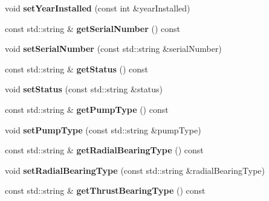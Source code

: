 \begin{DoxyCompactItemize}
\item 
\mbox{\label{class_pump_data_ae8b9757c60ce5d6bbc1b269f45205e16}} 
void {\bfseries set\+Year\+Installed} (const int \&year\+Installed)
\item 
\mbox{\label{class_pump_data_ae9f03754f319dc3ea833b22822f9b905}} 
const std\+::string \& {\bfseries get\+Serial\+Number} () const
\item 
\mbox{\label{class_pump_data_ac4dc6abcf6f6efc11ff1499d3e59d1e5}} 
void {\bfseries set\+Serial\+Number} (const std\+::string \&serial\+Number)
\item 
\mbox{\label{class_pump_data_acf09c826c9d73a69fd50f40479d509f3}} 
const std\+::string \& {\bfseries get\+Status} () const
\item 
\mbox{\label{class_pump_data_a0e4ac6c9e8440b66d5c02d7a592e93f5}} 
void {\bfseries set\+Status} (const std\+::string \&status)
\item 
\mbox{\label{class_pump_data_a387fe20da5c66f2619fd0f5d5c04eafd}} 
const std\+::string \& {\bfseries get\+Pump\+Type} () const
\item 
\mbox{\label{class_pump_data_a686c299f2540e968b3a9734ebb700fa0}} 
void {\bfseries set\+Pump\+Type} (const std\+::string \&pump\+Type)
\item 
\mbox{\label{class_pump_data_a2624c60f02a5c068d4c072829d646bef}} 
const std\+::string \& {\bfseries get\+Radial\+Bearing\+Type} () const
\item 
\mbox{\label{class_pump_data_aca98c7dbba6fd67e02cf7b5088c5f9ed}} 
void {\bfseries set\+Radial\+Bearing\+Type} (const std\+::string \&radial\+Bearing\+Type)
\item 
\mbox{\label{class_pump_data_a2981c2fa4cf3f086a22a7b5b011ee9e2}} 
const std\+::string \& {\bfseries get\+Thrust\+Bearing\+Type} () const
\item 
\mbox{\label{class_pump_data_ab9bcb47cc75a022c2944f125b156e10d}} 

\end{DoxyCompactItemize}
